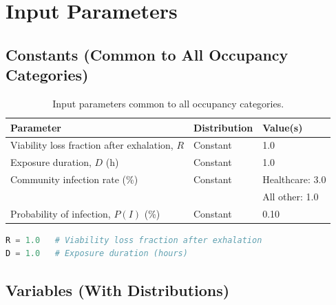 \documentclass[12pt]{article}
\begin{document}
\section*{Input Parameters}

\subsection*{Constants (Common to All Occupancy Categories)}

\begin{table}[h!]
\centering
\begin{tabular}{@{}lll@{}}
\toprule
\textbf{Parameter} & \textbf{Distribution} & \textbf{Value(s)} \\ \midrule
Viability loss fraction after exhalation, $R$ & Constant & 1.0 \\
Exposure duration, $D$ (h)                    & Constant & 1.0 \\
Community infection rate (\%)                & Constant & Healthcare: 3.0 \\
                                             &          & All other: 1.0 \\
Probability of infection, $P(I)$ (\%)        & Constant & 0.10 \\ \bottomrule
\end{tabular}
\caption{Input parameters common to all occupancy categories.}
\label{tab:input-constants}
\end{table}

\begin{lstlisting}[language=Python, caption={Python constants based on Table 1}]
R = 1.0   # Viability loss fraction after exhalation
D = 1.0   # Exposure duration (hours)
\end{lstlisting}



\subsection*{Variables (With Distributions)}
\end{document}
